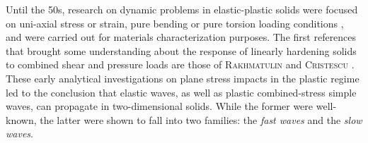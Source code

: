 

Until the 50s, research on dynamic problems in elastic-plastic solids were focused on uni-axial stress or strain, pure bending or pure torsion loading conditions \cite{Taylor,vonKarman}, and were carried out for materials characterization purposes.
The first references that brought some understanding about the response of linearly hardening solids to combined shear and pressure loads are those of \textsc{Rakhmatulin} \cite{Rakhmatulin} and \textsc{Cristescu} \cite{CRISTESCU19591605}.
These early analytical investigations on plane stress impacts in the plastic regime led to the conclusion that elastic waves, as well as plastic combined-stress simple waves, can propagate in two-dimensional solids. 
While the former were well-known, the latter were shown to fall into two families: the \textit{fast waves} and the \textit{slow waves}.

